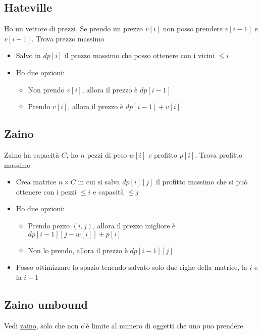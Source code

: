 \subsection{Hateville}
Ho un vettore di prezzi. Se prendo un prezzo $ v\left[i\right] $ non posso prendere $ v\left[i-1\right] $ e $ v\left[i+1\right] $. Trova prezzo massimo

\vskip3mm\vskip3mm
\begin{itemize}
	\item Salvo in $ dp\left[i\right] $ il prezzo massimo che posso ottenere con i vicini $ \le i $
	\item Ho due opzioni:
	      \begin{itemize}
		      \item Non prendo $ v\left[i\right] $, allora il prezzo è $ dp\left[i-1\right] $
		      \item Prendo $ v\left[i\right] $, allora il prezzo è $ dp\left[i-1\right] + v\left[i\right] $
	      \end{itemize}
\end{itemize}
\subsection{Zaino}\label{zaino}
Zaino ha capacità $ C $, ho $ n $ pezzi di peso $ w\left[i\right] $ e profitto $ p\left[i\right] $. Trova profitto massimo

\vskip3mm\vskip3mm
\begin{itemize}
	\item Crea matrice $ n \times C $ in cui si salva $ dp\left[i\right]\left[j\right] $ il profitto massimo che si può ottenere con i pezzi $ \le i $ e capacità $ \le j $
	\item Ho due opzioni:
	      \begin{itemize}
		      \item Prendo pezzo $ \left(i,j\right) $, allora il prezzo migliore è $ dp\left[i-1\right]\left[j - w\left[i\right]\right] + p\left[i\right] $
		      \item Non lo prendo, allora il prezzo è $ dp\left[i-1\right]\left[j\right] $
	      \end{itemize}
	\item Posso ottimizzare lo spazio tenendo salvato solo due righe della matrice, la $ i $ e la $ i-1 $
\end{itemize}
\subsection{Zaino umbound}
Vedi \hyperref[zaino]{zaino}, solo che non c'è limite al numero di oggetti che uno puo prendere

